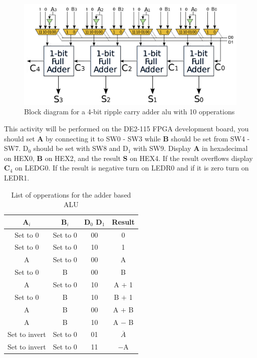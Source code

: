 \begin{figure}[H]
	\centering
	\includegraphics[width=150mm]{Lab3/figures/fulladderalu.png}
	\caption{Block diagram for a 4-bit ripple carry adder alu with 10 opperations}
	\label{fig:fulladderalu}
\end{figure}

This activity will be performed on the DE2-115 FPGA development board, you should set {\bf A} by connecting it to SW0 - SW3 while {\bf B} should be set from SW4 - SW7. D$_0$ should be set with SW8 and D$_1$ with SW9. Display {\bf A} in hexadecimal on HEX0, {\bf B} on HEX2, and the result {\bf S} on HEX4. If the result overflows display {\bf C$_4$} on LEDG0. If the result is negative turn on LEDR0 and if it is zero turn on LEDR1.

\begin{table}[H]
	\centering
	\caption{List of opperations for the adder based ALU}
	\begin{tabular}{ | c | c | c | c | }
		\hline                        
 		\bf A$_i$ & \bf B$_i$ & \bf D$_0$ D$_1$ & \bf Result \\ \hline
 		Set to 0 & Set to 0 & 00 & 0 \\ \hline
 		Set to 0 &  Set to 0 &10 & 1 \\ \hline
 		A &  Set to 0 & 00 & A \\ \hline
 		Set to 0& B  & 00  & B  \\ \hline
 		A & Set to 0 & 10 & A $+$ 1 \\ \hline
 		Set to 0 & B & 10 & B $+$ 1 \\ \hline
 		A & B & 00 & A $+$ B \\ \hline
 		A & B & 10 & A $-$ B \\ \hline
 		Set to invert & Set to 0 & 01 & $\overline{A}$ \\ \hline
 		Set to invert & Set to 0 & 11 & $-$A \\ 
 		\hline
	\end{tabular}
	\label{tab:adderaluop}
\end{table}

